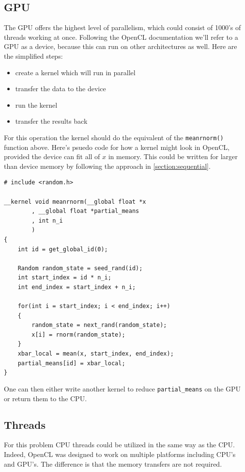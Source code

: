 \documentclass[12pt]{article}
\begin{document}
\subsection{GPU}

The GPU offers the highest level of parallelism, which could consist of
1000's of threads working at once. Following the OpenCL documentation we'll
refer to a GPU as a device, because this can run on other architectures as
well. Here are the simplified steps:

\begin{itemize}
    \item create a kernel which will run in parallel
    \item transfer the data to the device
    \item run the kernel
    \item transfer the results back
\end{itemize}

For this operation the kernel should do the equivalent of the
\texttt{meanrnorm()} function above.  Here's psuedo code for how a kernel
might look in OpenCL, provided the device can fit all of $x$ in memory.
This could be written for larger than device memory by following the
approach in \ref{section:sequential}.

\begin{verbatim}
# include <random.h>

__kernel void meanrnorm(__global float *x
        , __global float *partial_means
        , int n_i
        )
{
    int id = get_global_id(0);

    Random random_state = seed_rand(id);
    int start_index = id * n_i;
    int end_index = start_index + n_i;

    for(int i = start_index; i < end_index; i++)
    {
        random_state = next_rand(random_state);
        x[i] = rnorm(random_state);
    }
    xbar_local = mean(x, start_index, end_index);
    partial_means[id] = xbar_local;
}
\end{verbatim}

One can then either write another kernel to reduce
\texttt{partial\_means} on the GPU or return them to the CPU.

\subsection{Threads}

For this problem CPU threads could be utilized in the same way as the CPU.
Indeed, OpenCL was designed to work on multiple platforms including CPU's
and GPU's. The difference is that the memory transfers are not required.
\end{document}
